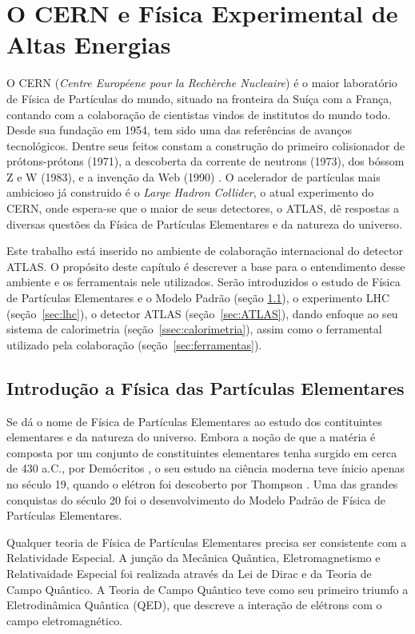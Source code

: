 \chapter{O CERN e Física Experimental de Altas Energias}

O CERN ({\it Centre Européene pour la Rechèrche Nucleaire}) é o maior
laboratório de Física de Partículas do mundo, situado na fronteira da Suíça com
a França, contando com a colaboração de cientistas vindos de institutos
do mundo todo. Desde sua fundação em 1954, tem sido uma das referências de
avanços tecnológicos. Dentre seus feitos constam a construção do primeiro 
colisionador de prótons-prótons (1971), a descoberta 
da corrente de neutrons (1973), dos bóssom Z e W (1983), 
e a invenção da Web (1990) \cite{webCERN}. O acelerador de partículas mais ambicioso 
\cite{Intro_Standard} já construido é o \emph{Large Hadron
Collider}, o atual experimento do CERN, onde espera-se que o maior de seus 
detectores, o ATLAS, dê respostas a diversas questões da Física de Partículas
Elementares e da natureza do universo.

Este trabalho está inserido no ambiente de colaboração internacional do detector
ATLAS. O propósito deste capítulo é descrever a base para o entendimento desse ambiente
e os ferramentais nele utilizados. Serão introduzidos o estudo de Física de Partículas
Elementares e o Modelo Padrão (seção \ref{sec:fis_part}), 
o experimento LHC (seção~\ref{sec:lhc}), o detector
ATLAS (seção~\ref{sec:ATLAS}), dando enfoque ao seu sistema de calorimetria
(seção~\ref{ssec:calorimetria}), assim como o ferramental utilizado pela colaboração
(seção~\ref{sec:ferramentas}).

\section{Introdução a Física das Partículas Elementares}
\label{sec:fis_part}

Se dá o nome de Física de Partículas Elementares ao estudo dos contituintes
elementares e da natureza do universo. Embora a noção de que a matéria é
composta por um conjunto de constituintes elementares tenha surgido em cerca de
430 a.C., por Demócritos \cite{democritos}, o seu estudo na ciência moderna teve ínicio apenas 
no século 19, quando o elétron foi descoberto por Thompson \cite{thompson}.
Uma das grandes conquistas do século 20 foi o desenvolvimento do Modelo Padrão
de Física de Partículas Elementares.  

Qualquer teoria de Física de Partículas Elementares precisa ser consistente com
a Relatividade Especial. A junção da Mecânica Quântica, Eletromagnetismo e
Relativaidade Especial foi realizada através da Lei de Dirac e da Teoria de
Campo Quântico. A Teoria de Campo Quântico teve como seu primeiro triumfo a
Eletrodinâmica Quântica (QED), que descreve a interação de elétrons com o campo
eletromagnético. 

